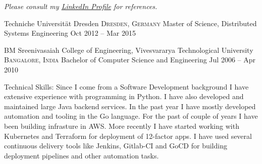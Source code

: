 \documentclass[10pt,a4paper]{article}
\begin{document}
\begin{center}
  \emph{Please consult my \href{https://de.linkedin.com/in/arnaik}{LinkedIn Profile} for references.}
\end{center}

\spacedhrule{-0.2em}{-0.4em}


\headedsection
  {Techniche Universit{\"a}t Dresden}
  {\textsc{Dresden, Germany}} {%
  \headedsubsection
    {Master of Science, Distributed Systems Engineering}
    {Oct 2012 -- Mar 2015}
    {
    }
}

\headedsection
  {BM Sreenivasaiah College of Engineering, Vivesvararya Technological University}
  {\textsc{Bangalore, India}} {%
  \headedsubsection
    {Bachelor of Computer Science and Engineering}
    {Jul 2006 -- Apr 2010}
    {
    }
}

\spacedhrule{1.6em}{-0.4em}


\inlineheadsection  %
  {Technical Skills:}
    {Since I come from a Software Development background I have extensive experience with programming in Python. I have also 
    developed and maintained large Java backend services. In the past year I have mostly developed automation and tooling in
    the Go language. For the past of couple of years I have been building infrasture in AWS. More recently I have started 
    working with Kubernetes and Terraform for deployment of 12-factor apps. I have used several continuous delivery tools
    like Jenkins, Gitlab-CI and GoCD for building deployment pipelines and other automation tasks.}
\end{document}
